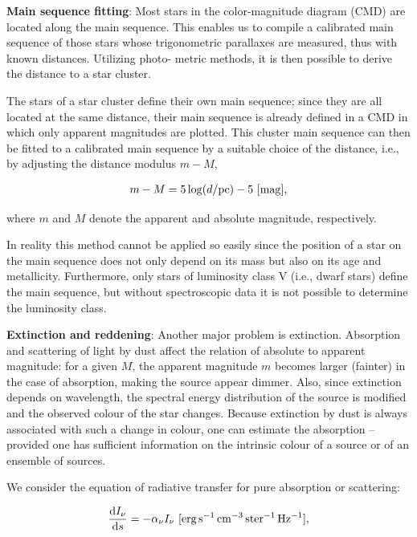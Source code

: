 \documentclass[a4paper,11pt]{article}
\begin{document}
{\noindent}\textbf{Main sequence fitting}: Most stars in the color-magnitude diagram (CMD) are located along the main sequence. This enables us to compile a calibrated main sequence of those stars whose trigonometric parallaxes are measured, thus with known distances. Utilizing photo- metric methods, it is then possible to derive the distance to a star cluster. 

{\noindent}The stars of a star cluster define their own main sequence; since they are all located at the same distance, their main sequence is already defined in a CMD in which only apparent magnitudes are plotted. This cluster main sequence can then be fitted to a calibrated main sequence by a suitable choice of the distance, i.e., by adjusting the distance modulus $m-M$,

\begin{align*}
    m-M = 5\log(d/{\rm pc}) - 5 ~ [{\rm mag}],
\end{align*}

{\noindent}where $m$ and $M$ denote the apparent and absolute magnitude, respectively.

{\noindent}In reality this method cannot be applied so easily since the position of a star on the main sequence does not only depend on its mass but also on its age and metallicity. Furthermore, only stars of luminosity class V (i.e., dwarf stars) define the main sequence, but without spectroscopic data it is not possible to determine the luminosity class.

{\noindent}\textbf{Extinction and reddening}: Another major problem is extinction. Absorption and scattering of light by dust affect the relation of absolute to apparent magnitude: for a given $M$, the apparent magnitude $m$ becomes larger (fainter) in the case of absorption, making the source appear dimmer. Also, since extinction depends on wavelength, the spectral energy distribution of the source is modified and the observed colour of the star changes. Because extinction by dust is always associated with such a change in colour, one can estimate the absorption -- provided one has sufficient information on the intrinsic colour of a source or of an ensemble of sources.

{\noindent}We consider the equation of radiative transfer for pure absorption or scattering:

\begin{align*}
    \frac{\mathrm{d}I_\nu}{\mathrm{d}s} = -\alpha_\nu I_\nu ~ [\rm erg\,s^{-1}\,cm^{-3}\,ster^{-1}\,Hz^{-1}],
\end{align*}
\end{document}
